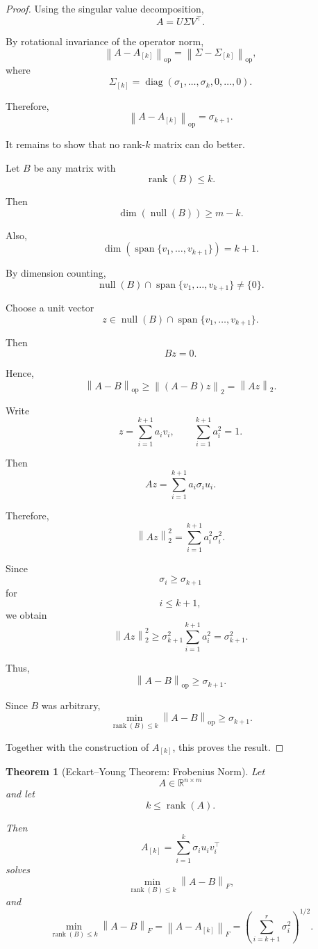 \documentclass[12pt,oneside]{book}
\numberwithin{equation}{section}
\theoremstyle{definition}
\theoremstyle{plain}
\newtheorem{theorem}{Theorem}[section]
\theoremstyle{remark}
\newcommand{\R}{\mathbb{R}}
\newcommand{\norm}[1]{\left\lVert #1 \right\rVert}
\newcommand{\rank}{\operatorname{rank}}
\newcommand{\diag}{\operatorname{diag}}
\begin{document}
\begin{proof}
Using the singular value decomposition,
\[
A=U\Sigma V^\top.
\]

By rotational invariance of the operator norm,
\[
\norm{A-A_{[k]}}_{\mathrm{op}}
=
\norm{\Sigma-\Sigma_{[k]}}_{\mathrm{op}},
\]
where
\[
\Sigma_{[k]}
=
\diag(\sigma_1,\dots,\sigma_k,0,\dots,0).
\]

Therefore,
\[
\norm{A-A_{[k]}}_{\mathrm{op}}
=
\sigma_{k+1}.
\]

It remains to show that no rank-$k$ matrix can do better.

Let $B$ be any matrix with
\[
\rank(B)\leq k.
\]

Then
\[
\dim(\operatorname{null}(B))\geq m-k.
\]

Also,
\[
\dim(\operatorname{span}\{v_1,\dots,v_{k+1}\})=k+1.
\]

By dimension counting,
\[
\operatorname{null}(B)
\cap
\operatorname{span}\{v_1,\dots,v_{k+1}\}
\neq
\{0\}.
\]

Choose a unit vector
\[
z\in
\operatorname{null}(B)
\cap
\operatorname{span}\{v_1,\dots,v_{k+1}\}.
\]

Then
\[
Bz=0.
\]

Hence,
\[
\norm{A-B}_{\mathrm{op}}
\geq
\norm{(A-B)z}_2
=
\norm{Az}_2.
\]

Write
\[
z=\sum_{i=1}^{k+1} a_i v_i,
\qquad
\sum_{i=1}^{k+1} a_i^2=1.
\]

Then
\[
Az
=
\sum_{i=1}^{k+1} a_i\sigma_i u_i.
\]

Therefore,
\[
\norm{Az}_2^2
=
\sum_{i=1}^{k+1} a_i^2\sigma_i^2.
\]

Since
\[
\sigma_i\geq \sigma_{k+1}
\]
for
\[
i\leq k+1,
\]
we obtain
\[
\norm{Az}_2^2
\geq
\sigma_{k+1}^2
\sum_{i=1}^{k+1}a_i^2
=
\sigma_{k+1}^2.
\]

Thus,
\[
\norm{A-B}_{\mathrm{op}}
\geq
\sigma_{k+1}.
\]

Since $B$ was arbitrary,
\[
\min_{\rank(B)\leq k}
\norm{A-B}_{\mathrm{op}}
\geq
\sigma_{k+1}.
\]

Together with the construction of $A_{[k]}$, this proves the result.
\end{proof}

\begin{theorem}[Eckart--Young Theorem: Frobenius Norm]
Let
\[
A\in\R^{n\times m}
\]
and let
\[
k\leq \rank(A).
\]

Then
\[
A_{[k]}
=
\sum_{i=1}^k \sigma_i u_i v_i^\top
\]
solves
\[
\min_{\rank(B)\leq k}
\norm{A-B}_F,
\]
and
\[
\min_{\rank(B)\leq k}
\norm{A-B}_F
=
\norm{A-A_{[k]}}_F
=
\left(
\sum_{i=k+1}^r \sigma_i^2
\right)^{1/2}.
\]
\end{theorem}
\end{document}
